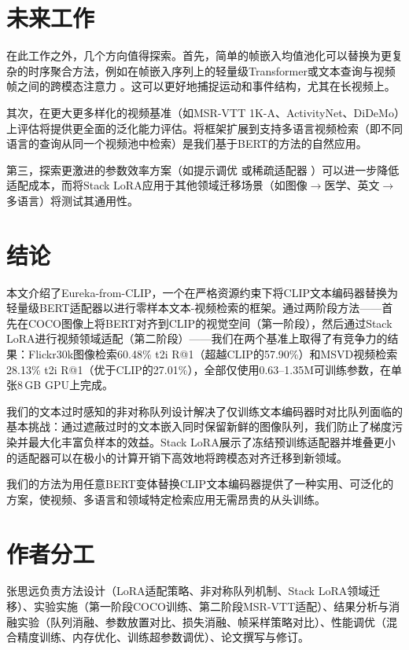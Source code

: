 \documentclass[10pt,a4paper]{ctexart}
\begin{document}
\section{未来工作}

在此工作之外，几个方向值得探索。首先，简单的帧嵌入均值池化可以替换为更复杂的时序聚合方法，例如在帧嵌入序列上的轻量级Transformer或文本查询与视频帧之间的跨模态注意力 \citep{gorti2022xpool}。这可以更好地捕捉运动和事件结构，尤其在长视频上。

其次，在更大更多样化的视频基准（如MSR-VTT 1K-A、ActivityNet、DiDeMo）上评估将提供更全面的泛化能力评估。将框架扩展到支持多语言视频检索（即不同语言的查询从同一个视频池中检索）是我们基于BERT的方法的自然应用。

第三，探索更激进的参数效率方案（如提示调优 \citep{huang2023vop} 或稀疏适配器 \citep{cao2024acl}）可以进一步降低适配成本，而将Stack LoRA应用于其他领域迁移场景（如图像$\to$医学、英文$\to$多语言）将测试其通用性。

\section{结论}

本文介绍了Eureka-from-CLIP，一个在严格资源约束下将CLIP文本编码器替换为轻量级BERT适配器以进行零样本文本-视频检索的框架。通过两阶段方法——首先在COCO图像上将BERT对齐到CLIP的视觉空间（第一阶段），然后通过Stack LoRA进行视频领域适配（第二阶段）——我们在两个基准上取得了有竞争力的结果：Flickr30k图像检索60.48\% t2i R@1（超越CLIP的57.90\%）和MSVD视频检索28.13\% t2i R@1（优于CLIP的27.01\%），全部仅使用0.63--1.35M可训练参数，在单张8\,GB GPU上完成。

我们的文本过时感知的非对称队列设计解决了仅训练文本编码器时对比队列面临的基本挑战：通过遮蔽过时的文本嵌入同时保留新鲜的图像队列，我们防止了梯度污染并最大化丰富负样本的效益。Stack LoRA展示了冻结预训练适配器并堆叠更小的适配器可以在极小的计算开销下高效地将跨模态对齐迁移到新领域。

我们的方法为用任意BERT变体替换CLIP文本编码器提供了一种实用、可泛化的方案，使视频、多语言和领域特定检索应用无需昂贵的从头训练。

\section{作者分工}

张思远负责方法设计（LoRA适配策略、非对称队列机制、Stack LoRA领域迁移）、实验实施（第一阶段COCO训练、第二阶段MSR-VTT适配）、结果分析与消融实验（队列消融、参数放置对比、损失消融、帧采样策略对比）、性能调优（混合精度训练、内存优化、训练超参数调优）、论文撰写与修订。
\end{document}
